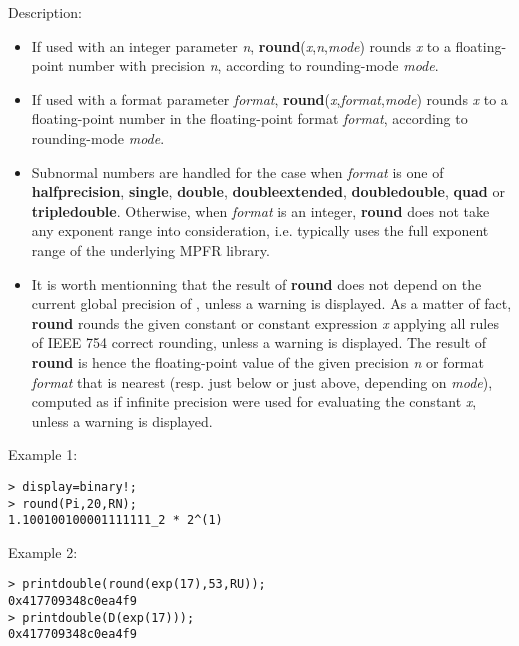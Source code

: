 \noindent Description: \begin{itemize}

\item If used with an integer parameter \emph{n}, \textbf{round}(\emph{x},\emph{n},\emph{mode}) rounds \emph{x} to a floating-point number with 
   precision \emph{n}, according to rounding-mode \emph{mode}. 

\item If used with a format parameter \emph{format}, \textbf{round}(\emph{x},\emph{format},\emph{mode}) rounds \emph{x} to a floating-point number in the 
   floating-point format \emph{format}, according to rounding-mode \emph{mode}. 

\item Subnormal numbers are handled for the case when \emph{format} is one of
   \textbf{halfprecision}, \textbf{single}, \textbf{double}, \textbf{doubleextended}, \textbf{doubledouble},
   \textbf{quad} or \textbf{tripledouble}. Otherwise, when \emph{format} is an integer,
   \textbf{round} does not take any exponent range into consideration,
   i.e. typically uses the full exponent range of the underlying MPFR
   library.

\item It is worth mentionning that the result of \textbf{round} does not depend on
   the current global precision of \sollya, unless a warning is
   displayed. As a matter of fact, \textbf{round} rounds the given constant or
   constant expression \emph{x} applying all rules of IEEE 754 correct
   rounding, unless a warning is displayed. The result of \textbf{round} is
   hence the floating-point value of the given precision \emph{n} or format
   \emph{format} that is nearest (resp. just below or just above, depending on
   \emph{mode}), computed as if infinite precision were used for evaluating
   the constant \emph{x}, unless a warning is displayed.
\end{itemize}
\noindent Example 1: 
\begin{center}\begin{minipage}{15cm}\begin{Verbatim}[frame=single]
> display=binary!;
> round(Pi,20,RN);
1.100100100001111111_2 * 2^(1)
\end{Verbatim}
\end{minipage}\end{center}
\noindent Example 2: 
\begin{center}\begin{minipage}{15cm}\begin{Verbatim}[frame=single]
> printdouble(round(exp(17),53,RU));
0x417709348c0ea4f9
> printdouble(D(exp(17)));
0x417709348c0ea4f9
\end{Verbatim}
\end{minipage}\end{center}
